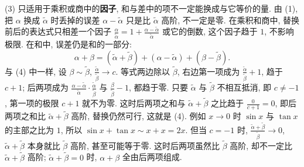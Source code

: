 \documentclass[UTF8,openany]{ctexbook}
\theoremstyle{chinesetextbook}
\begin{document}
(3) 只适用于乘积或商中的\textbf{因子}, 和与差中的项不一定能换成与它等价的量. 由 (1), 把 $\alpha$ 换成 $\widetilde\alpha$ 时丢掉的误差 $\alpha-\widetilde\alpha$ 只是比 $\widetilde\alpha$ 高阶, 不一定是零. 在乘积和商中, 替换前后的表达式只相差一个因子 $\displaystyle\frac\alpha{\widetilde\alpha}=1+\frac{\alpha-\widetilde\alpha}{\widetilde\alpha}$ 或它的倒数, 这个因子趋于 $1$, 不影响极限. 在和中, 误差仍是和的一部分:
\[
\alpha+\beta=(\widetilde\alpha+\widetilde\beta)+(\alpha-\widetilde\alpha)+(\beta-\widetilde\beta).
\]
与 (4) 中一样, 设 $\beta\sim\widetilde\beta$, $\displaystyle\frac{\widetilde\alpha}{\widetilde\beta}\to c$. 等式两边除以 $\widetilde\beta$, 右边第一项成为 $\displaystyle\frac{\widetilde\alpha}{\widetilde\beta}+1$, 趋于 $c+1$; 后两项成为 $\displaystyle\frac{\alpha-\widetilde\alpha}{\widetilde\alpha}\cdot\frac{\widetilde\alpha}{\widetilde\beta}$ 与 $\displaystyle\frac\beta{\widetilde\beta}-1$, 都趋于零. 只要 $\widetilde\alpha$ 与 $\widetilde\beta$ 不相互抵消, 即 $c\ne-1$, 第一项的极限 $c+1$ 就不为零. 这时后两项之和与 $\widetilde\alpha+\widetilde\beta$ 之比趋于 $\displaystyle\frac0{c+1}=0$, 即后两项之和比 $\widetilde\alpha+\widetilde\beta$ 高阶, 替换仍然可行, 这就是 (4). 例如 $x\to0$ 时 $\sin x$ 与 $\tan x$ 的主部之比为 $1$, 所以 $\sin x+\tan x\sim x+x=2x$. 但当 $c=-1$ 时, $\displaystyle\frac{\widetilde\alpha+\widetilde\beta}{\widetilde\beta}\to0$, $\widetilde\alpha+\widetilde\beta$ 本身就比 $\widetilde\beta$ 高阶, 甚至可能等于零. 这时后两项虽然比 $\widetilde\beta$ 高阶, 却不一定比 $\widetilde\alpha+\widetilde\beta$ 高阶; $\widetilde\alpha+\widetilde\beta=0$ 时, $\alpha+\beta$ 全由后两项组成.
\end{document}
